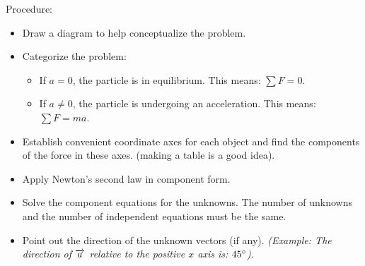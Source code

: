             \par Procedure:
            \begin{itemize}
                \item Draw a diagram to help conceptualize the problem.
                \item Categorize the problem:
                    \begin{itemize}
                        \item If $a = 0$, the particle is in equilibrium.
                            This means: $\sum F = 0$.
                        \item If $a \neq 0$, the particle is undergoing an acceleration.
                            This means: $\sum F = ma$.
                    \end{itemize}
                \item Establish convenient coordinate axes for each object and find the components
                    of the force in these axes. (making a table is a good idea).
                \item Apply Newton's second law in component form.
                \item Solve the component equations for the unknowns. The number of unknowns and
                    the number of independent equations must be the same.
                \item Point out the direction of the unknown vectors (if any). \textit{(Example:
                    The direction of $\overrightarrow{a}$ relative to the positive $x$ axis is: $45 \degree$)}.
            \end{itemize}


